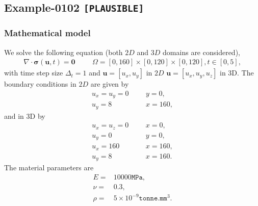 %
\clearpage
%
\subsection{Example-0102 \texttt{[PLAUSIBLE]}}
%
%
\subsubsection{Mathematical model}
%
We solve the following equation (both $2D$ and $3D$ domains are considered),
%
\begin{align}
    \nabla \cdot \boldsymbol{\sigma} (\boldsymbol{u}, t) = \boldsymbol{0} & &&\Omega = [0, 160] \times [0, 120] \times [0, 120], t \in [0, 5],
\end{align}
%
with time step size $\Delta_t = 1$ and $\boldsymbol{u} = [u_x,u_y]$ in $2D$ $\boldsymbol{u} = [u_x,u_y,u_z]$ in 3D. The boundary conditions in $2D$ are given by
%
\begin{align}
    u_x = u_y = 0 & &&y = 0, \\
		u_y = 8 & &&x = 160,
\end{align}
%
and in 3D by
\begin{align}
    u_x = u_z = 0 & &&x = 0, \\
    u_y = 0 & &&y = 0, \\
		u_x = 160 & &&x = 160, \\
		u_y = 8 & &&x = 160.
\end{align}
The material parameters are
\begin{align}
    E = & 10000\texttt{MPa}, \\
    \nu = & 0.3, \\
		\rho = & 5 \times 10^{-9}\texttt{tonne.mm$^3$}.
\end{align}
%
%
